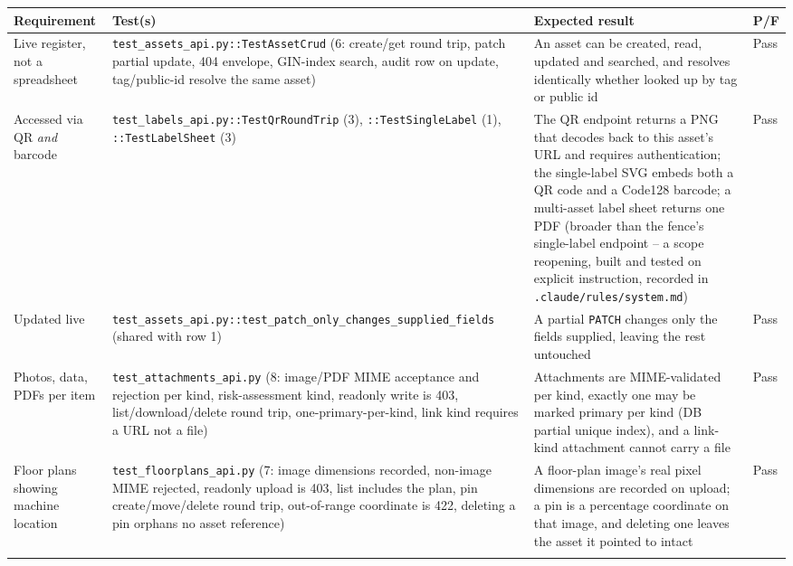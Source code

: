 \documentclass[11pt]{article}
\begin{document}
\begin{longtable}{p{3.1cm}p{5.0cm}p{4.3cm}p{1.0cm}}
\toprule
\textbf{Requirement} & \textbf{Test(s)} & \textbf{Expected result} & \textbf{P/F} \\
\midrule
\endhead

Live register, not a spreadsheet &
\texttt{test\_\allowbreak{}assets\_\allowbreak{}api.py\allowbreak{}::\allowbreak{}TestAssetCrud} (6: create/get round trip, patch partial update,
404 envelope, GIN-index search, audit row on update, tag/public-id resolve the same asset) &
An asset can be created, read, updated and searched, and resolves identically whether looked up
by tag or public id & Pass \\
\addlinespace

Accessed via QR \emph{and} barcode &
\texttt{test\_\allowbreak{}labels\_\allowbreak{}api.py\allowbreak{}::\allowbreak{}TestQrRoundTrip} (3), \texttt{::\allowbreak{}TestSingleLabel} (1),
\texttt{::\allowbreak{}TestLabelSheet} (3) &
The QR endpoint returns a PNG that decodes back to this asset's URL and requires
authentication; the single-label SVG embeds both a QR code and a Code128 barcode; a
multi-asset label sheet returns one PDF (broader than the fence's single-label endpoint --
a scope reopening, built and tested on explicit instruction, recorded in
\texttt{.claude/rules/system.md}) & Pass \\
\addlinespace

Updated live &
\texttt{test\_\allowbreak{}assets\_\allowbreak{}api.py\allowbreak{}::\allowbreak{}test\_\allowbreak{}patch\_\allowbreak{}only\_\allowbreak{}changes\_\allowbreak{}supplied\_\allowbreak{}fields} (shared with row 1) &
A partial \texttt{PATCH} changes only the fields supplied, leaving the rest untouched & Pass \\
\addlinespace

Photos, data, PDFs per item &
\texttt{test\_\allowbreak{}attachments\_\allowbreak{}api.py\allowbreak{}} (8: image/PDF MIME acceptance and rejection per kind,
risk-assessment kind, readonly write is 403, list/download/delete round trip, one-primary-per-kind,
link kind requires a URL not a file) &
Attachments are MIME-validated per kind, exactly one may be marked primary per kind (DB partial
unique index), and a link-kind attachment cannot carry a file & Pass \\
\addlinespace

Floor plans showing machine location &
\texttt{test\_\allowbreak{}floorplans\_\allowbreak{}api.py\allowbreak{}} (7: image dimensions recorded, non-image MIME rejected,
readonly upload is 403, list includes the plan, pin create/move/delete round trip, out-of-range
coordinate is 422, deleting a pin orphans no asset reference) &
A floor-plan image's real pixel dimensions are recorded on upload; a pin is a percentage
coordinate on that image, and deleting one leaves the asset it pointed to intact & Pass \\
\addlinespace


\end{longtable}
\end{document}

